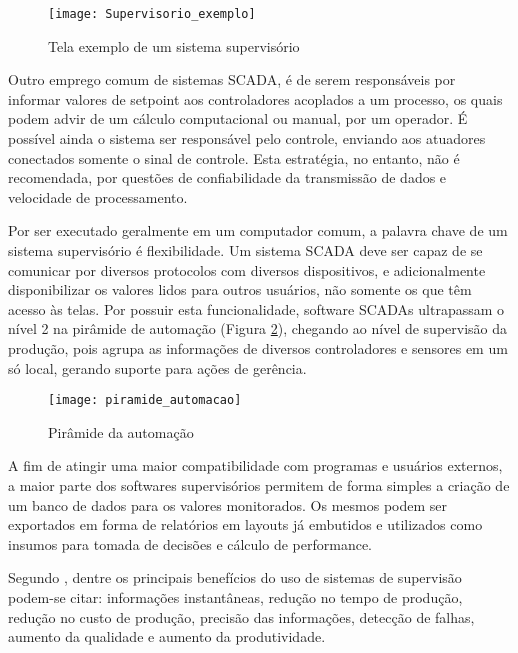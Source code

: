 \begin{figure}[hbt]
	\centering
	\texttt{[image: Supervisorio\_exemplo]}
	\caption[Fonte: https://www.agaads.com/service/scada-system/]{Tela exemplo de um sistema supervisório}
	\label{img_supervisorio_exemplo}
\end{figure}

Outro emprego comum de sistemas SCADA, é de serem responsáveis por informar valores de setpoint aos controladores acoplados a um processo, os quais podem advir de um cálculo computacional ou manual, por um operador. É possível ainda o sistema ser responsável pelo controle, enviando aos atuadores conectados somente o sinal de controle. Esta estratégia, no entanto, não é recomendada, por questões de confiabilidade da transmissão de dados e velocidade de processamento.

Por ser executado geralmente em um computador comum, a palavra chave de um sistema supervisório é flexibilidade. Um sistema SCADA deve ser capaz de se comunicar por diversos protocolos com diversos dispositivos, e adicionalmente disponibilizar os valores lidos para outros usuários, não somente os que têm acesso às telas. Por possuir esta funcionalidade, software SCADAs ultrapassam o nível 2 na pirâmide de automação (Figura \ref{img_piramide_automacao}), chegando ao nível de supervisão da produção, pois agrupa as informações de diversos controladores e sensores em um só local, gerando suporte para ações de gerência.

\begin{figure}[hbt]
	\centering
	\texttt{[image: piramide\_automacao]}
	\caption[Fonte: https://www.logiquesistemas.com.br/blog/piramide-de-automacao-industrial/attachment/354/]{Pirâmide da automação}
	\label{img_piramide_automacao}
\end{figure}

A fim de atingir uma maior compatibilidade com programas e usuários externos, a maior parte dos softwares supervisórios permitem de forma simples a criação de um banco de dados para os valores monitorados. Os mesmos podem ser exportados em forma de relatórios em layouts já embutidos e utilizados como insumos para tomada de decisões e cálculo de performance.

Segundo \cite{Roggia2016}, dentre os principais benefícios do uso de sistemas de supervisão podem-se citar: informações instantâneas, redução no tempo de produção, redução no custo de produção, precisão das informações, detecção de falhas, aumento da qualidade e aumento da produtividade.

